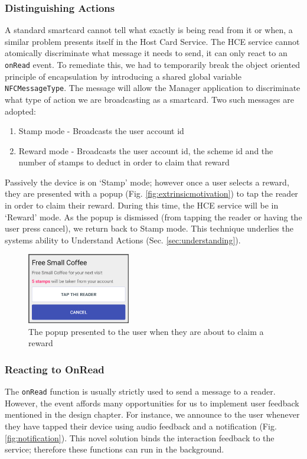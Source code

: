 \subsubsection{Distinguishing Actions}
A standard smartcard cannot tell what exactly is being read from it or when, a similar problem presents itself in the Host Card Service. The HCE service cannot atomically discriminate what message it needs to send, it can only react to an \texttt{onRead} event. To remediate this, we had to temporarily break the object oriented principle of encapsulation by introducing a shared global variable \texttt{NFCMessageType}. The message will allow the Manager application to discriminate what type of action we are broadcasting as a smartcard. Two such messages are adopted:
\begin{enumerate}
 \item Stamp mode - Broadcasts the user account id
  \item Reward mode - Broadcasts the user account id, the scheme id and the number of stamps to deduct in order to claim that reward
\end{enumerate}
Passively the device is on `Stamp' mode; however once a user selects a reward, they are presented with a popup (Fig. \ref{fig:extrinsicmotivation}) to tap the reader in order to claim their reward. During this time, the HCE service will be in `Reward' mode. As the popup is dismissed (from tapping the reader or having the user press cancel), we return back to Stamp mode. This technique underlies the systems ability to Understand Actions (Sec. \ref{sec:understanding}).

\begin{figure}[H]
 \centering
  \includegraphics[width=0.40\textwidth]{img/claimreward.png}
     \caption{The popup presented to the user when they are about to claim a reward}
     \label{fig:claimreward}
\end{figure}

\subsubsection{Reacting to OnRead}
The \texttt{onRead} function is usually strictly used to send a message to a reader. However, the event affords many opportunities for us to implement user feedback mentioned in the design chapter. For instance, we announce to the user whenever they have tapped their device using audio feedback and a notification (Fig. \ref{fig:notification}). This novel solution binds the interaction feedback to the service; therefore these functions can run in the background.

